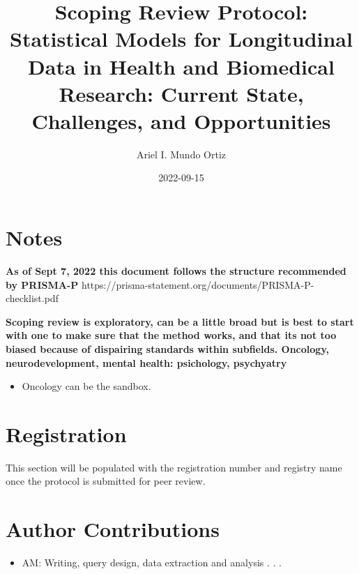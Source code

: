 \documentclass[
]{article}
\title{Scoping Review Protocol: Statistical Models for Longitudinal Data
in Health and Biomedical Research: Current State, Challenges, and
Opportunities}
\author{Ariel I. Mundo Ortiz}
\date{2022-09-15}
\providecommand{\tightlist}{%
  \setlength{\itemsep}{0pt}\setlength{\parskip}{0pt}}\usepackage{longtable,booktabs,array}
\renewcommand*\contentsname{Table of contents}
\newcommand\contentsname{Table of contents}
\begin{document}
\maketitle
\ifdefined\Shaded\renewenvironment{Shaded}{\begin{tcolorbox}[sharp corners, interior hidden, frame hidden, borderline west={3pt}{0pt}{shadecolor}, boxrule=0pt, enhanced, breakable]}{\end{tcolorbox}}\fi

\renewcommand*\contentsname{Table of contents}
{
\hypersetup{linkcolor=}
\setcounter{tocdepth}{3}
\tableofcontents
}
\hypertarget{notes}{%
\section{Notes}\label{notes}}

\textbf{As of Sept 7, 2022 this document follows the structure
recommended by PRISMA-P}
https://prisma-statement.org/documents/PRISMA-P-checklist.pdf

\textbf{Scoping review is exploratory, can be a little broad but is best
to start with one to make sure that the method works, and that its not
too biased because of dispairing standards within subfields. Oncology,
neurodevelopment, mental health: psichology, psychyatry}

\begin{itemize}
\tightlist
\item
  Oncology can be the sandbox.
\end{itemize}

\hypertarget{registration}{%
\section{Registration}\label{registration}}

This section will be populated with the registration number and registry
name once the protocol is submitted for peer review.

\hypertarget{author-contributions}{%
\section{Author Contributions}\label{author-contributions}}

\begin{itemize}
\tightlist
\item
  AM: Writing, query design, data extraction and analysis . . .
\end{itemize}
\end{document}
